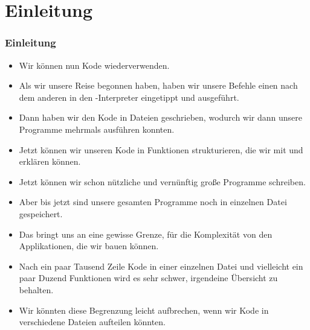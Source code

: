 \documentclass[aspectratio=169,mathserif,notheorems]{beamer}%
\subtitle{27.~Funktionen in Modulen}%
\begin{document}
%
%
\startPresentation%
%
\section{Einleitung}%
\begin{frame}%
\frametitle{Einleitung}%
\begin{itemize}%
%
%
%
%
%
\item<3-> Wir können nun Kode wiederverwenden.%
%
\item<4-> Als wir unsere Reise begonnen haben, haben wir unsere Befehle einen nach dem anderen in den \python-Interpreter eingetippt und ausgeführt.%
%
\item<5-> Dann haben wir den Kode in Dateien geschrieben, wodurch wir dann unsere Programme mehrmals ausführen konnten.%
%
\item<6-> Jetzt können wir unseren Kode in Funktionen strukturieren, die wir mit  und  erklären können.%
%
\item<7-> Jetzt können wir schon nützliche und vernünftig große Programme schreiben.%
%
\item<8-> Aber bis jetzt sind unsere gesamten Programme noch in einzelnen Datei gespeichert.%
%
\item<9-> Das bringt uns an eine gewisse Grenze, für die Komplexität von den Applikationen, die wir bauen können.%
%
\item<10-> Nach ein paar Tausend Zeile Kode in einer einzelnen Datei und vielleicht ein paar Duzend Funktionen wird es sehr schwer, irgendeine Übersicht zu behalten.%
%
\item<11-> Wir könnten diese Begrenzung leicht aufbrechen, wenn wir Kode in verschiedene Dateien aufteilen könnten.%
%
\end{itemize}%
\end{frame}%
%
\end{document}
